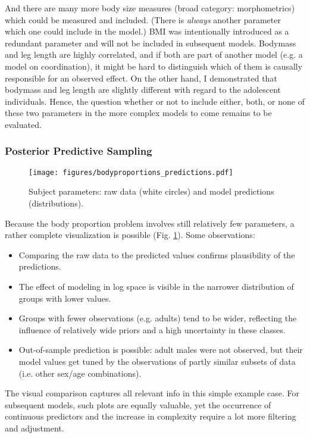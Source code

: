 And there are many more body size measures (broad category: morphometrics) which could be measured and included.
(There is \emph{always} another parameter which one could include in the model.)
BMI was intentionally introduced as a redundant parameter and will not be included in subsequent models.
Bodymass and leg length are highly correlated, and if both are part of another model (e.g. a model on coordination), it might be hard to distinguish which of them is causally responsible for an observed effect.
On the other hand, I demonstrated that bodymass and leg length are slightly different with regard to the adolescent individuals.
Hence, the question whether or not to include either, both, or none of these two parameters in the more complex models to come remains to be evaluated.

\subsubsection{Posterior Predictive Sampling}
\label{sec:org805e0cf}

\begin{figure}[p]
\centering
\texttt{[image: figures/bodyproportions\_predictions.pdf]}
\caption{\label{fig:bodyproportions}Subject parameters: raw data (white circles) and model predictions (distributions).}
\end{figure}

Because the body proportion problem involves still relatively few parameters, a rather complete visualization is possible (Fig. \ref{fig:bodyproportions}).
Some observations:
\begin{itemize}
\item Comparing the raw data to the predicted values confirms plausibility of the predictions.
\item The effect of modeling in log space is visible in the narrower distribution of groups with lower values.
\item Groups with fewer observations (e.g. adults) tend to be wider, reflecting the influence of relatively wide priors and a high uncertainty in these classes.
\item Out-of-sample prediction is possible: adult males were not observed, but their model values get tuned by the observations of partly similar subsets of data (i.e. other sex/age combinations).
\end{itemize}

The visual comparison captures all relevant info in this simple example case.
For subsequent models, such plots are equally valuable, yet the occurrence of continuous predictors and the increase in complexity require a lot more filtering and adjustment.



